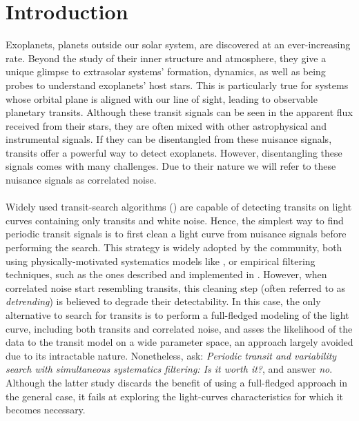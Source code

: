 \documentclass{aastex631}
\begin{document}
\section*{Introduction}
\label{sec:intro}
Exoplanets, planets outside our solar system, are discovered at an ever-increasing rate. Beyond the study of their inner structure and atmosphere, they give a unique glimpse to extrasolar systems' formation, dynamics, as well as being probes to understand exoplanets' host stars. This is particularly true for systems whose orbital plane is aligned with our line of sight, leading to observable planetary transits. Although these transit signals can be seen in the apparent flux received from their stars, they are often mixed with other astrophysical and instrumental signals. 
If they can be disentangled from these nuisance signals, transits offer a powerful way to detect exoplanets. However, disentangling these signals comes with many challenges. Due to their nature we will refer to these nuisance signals as correlated noise.
\\\\
Widely used transit-search algorithms (\cite{bls}) are capable of detecting transits on light curves containing only transits and white noise. Hence, the simplest way to find periodic transit signals is to first clean a light curve from nuisance signals before performing the search. This strategy is widely adopted by the community, both using physically-motivated systematics models like \cite{everest1, everest2}, or empirical filtering techniques, such as the ones described and implemented in \cite{wotan}. However, when correlated noise start resembling transits, this cleaning step (often referred to as \textit{detrending}) is believed to degrade their detectability. In this case, the only alternative to search for transits is to perform a full-fledged modeling of the light curve, including both transits and correlated noise, and asses the likelihood of the data to the transit model on a wide parameter space, an approach largely avoided due to its intractable nature. Nonetheless, \citealt{kovacs2016} ask: \textit{Periodic transit and variability search with simultaneous systematics filtering: Is it worth it?}, and answer \textit{no}. Although the latter study discards the benefit of using a full-fledged approach in the general case, it fails at exploring the light-curves characteristics for which it becomes necessary.\\
\end{document}
